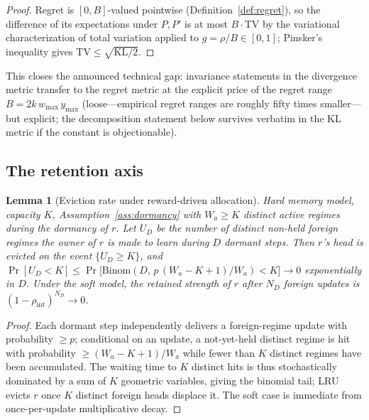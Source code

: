 \documentclass{article}
\newtheorem{lemma}{Lemma}
\newcommand{\TV}{\mathrm{TV}}
\newcommand{\KL}{\mathrm{KL}}
\newcommand{\regret}{\rho}
\begin{document}
\begin{proof}
Regret is $[0, B]$-valued pointwise (Definition~\ref{def:regret}), so the
difference of its expectations under $P, P'$ is at most $B \cdot \TV$ by
the variational characterization of total variation applied to
$g = \regret / B \in [0,1]$; Pinsker's inequality
\citep{tsybakov2009introduction} gives $\TV \le \sqrt{\KL/2}$.
\end{proof}

This closes the announced technical gap: invariance statements in the
divergence metric transfer to the regret metric at the explicit price of the
regret range $B = 2 k\, w_{\max}\, y_{\max}$ (loose---empirical regret
ranges are roughly fifty times smaller---but explicit; the decomposition
statement below survives verbatim in the KL metric if the constant is
objectionable).

\subsection{The retention axis}

\begin{lemma}[Eviction rate under reward-driven allocation]
\label{lem:eviction}
Hard memory model, capacity $K$, Assumption~\ref{ass:dormancy} with $W_a \ge
K$ distinct active regimes during the dormancy of $r$. Let $U_D$ be the
number of distinct non-held foreign regimes the owner of $r$ is made to
learn during $D$ dormant steps. Then $r$'s head is evicted on the event
$\{U_D \ge K\}$, and
$\Pr[U_D < K] \le \Pr\big[\mathrm{Binom}(D,\, p\,(W_a - K + 1)/W_a) < K\big]
\to 0$ exponentially in $D$. Under the soft model, the retained strength of
$r$ after $N_D$ foreign updates is $(1 - \rho_{\mathrm{int}})^{N_D} \to 0$.
\end{lemma}

\begin{proof}
Each dormant step independently delivers a foreign-regime update with
probability $\ge p$; conditional on an update, a not-yet-held distinct
regime is hit with probability $\ge (W_a - K + 1)/W_a$ while fewer than $K$
distinct regimes have been accumulated. The waiting time to $K$ distinct
hits is thus stochastically dominated by a sum of $K$ geometric variables,
giving the binomial tail; LRU evicts $r$ once $K$ distinct foreign heads
displace it. The soft case is immediate from once-per-update multiplicative
decay.
\end{proof}
\end{document}
